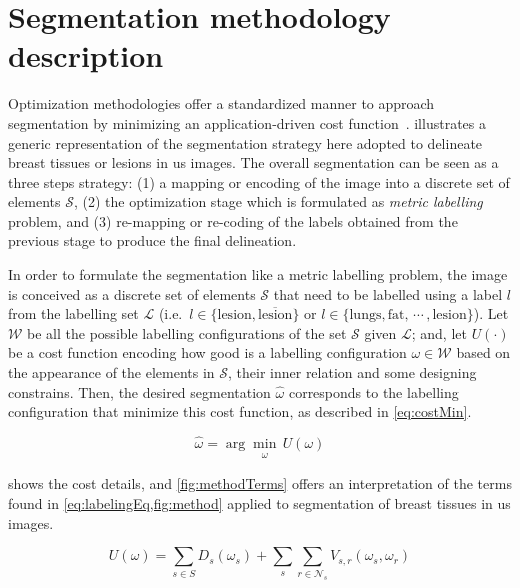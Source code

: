 \graphicspath{ {./content/method/figures/} }

\section{Segmentation methodology description} 

Optimization methodologies offer a standardized manner to approach segmentation by minimizing an application-driven cost function~\cite{cremers2007review}.
 illustrates a generic representation of the segmentation strategy here adopted to delineate breast tissues or lesions in \ac{us} images. 
The overall segmentation can be seen as a three steps strategy: 
(1) a mapping or encoding of the image into a discrete set of elements $\mathcal{S}$, 
(2) the optimization stage which is formulated as \emph{metric labelling} problem, 
and (3) re-mapping or re-coding of the labels obtained from the previous stage to produce the final delineation. 

In order to formulate the segmentation like a metric labelling problem, the image is conceived as a discrete set of elements $\mathcal{S}$ that need to be labelled using a label $l$ from the labelling set $\mathcal{L}$ 
(i.e.\, $l \in \{\text{lesion}, \overline{\text{lesion}}\}$ 
or $l \in \{\text{lungs}, \text{fat},\,\cdots\,, \text{lesion}\}$).
Let $\mathcal{W}$ be all the possible labelling configurations of the set $\mathcal{S}$ given $\mathcal{L}$; and, let $U(\cdot)$ be a cost function encoding how good is a labelling configuration $\omega \in \mathcal{W}$ based on the appearance of the elements in $\mathcal{S}$, their inner relation and some designing constrains.
Then, the desired segmentation $\hat{\omega}$ corresponds to the labelling configuration that minimize this cost function, as described in \cref{eq:costMin}.

\begin{equation}
\hat{\omega} = \arg \min_{\substack{\omega}} \,U(\omega)
\label{eq:costMin}
\end{equation}

 shows the cost details, and \cref{fig:methodTerms} offers an interpretation of the terms found in \cref{eq:labelingEq,fig:method} applied to segmentation of breast tissues in \ac{us} images.

\begin{equation}
  U(\omega) = \sum_{s\in S} D_s(\omega_s) + \sum_{s}\sum_{r \in \mathcal{N}_{s}} V_{s,r}(\omega_s,\omega_r)
  \label{eq:labelingEq}
\end{equation}


